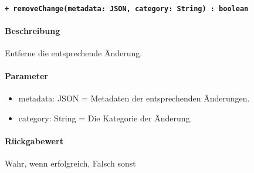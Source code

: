 \paragraph{\texttt{+ removeChange(metadata: JSON, category: String) : boolean}}%
\paragraph*{Beschreibung}
Entferne die entsprechende Änderung.
\paragraph*{Parameter}
\begin{itemize}
    \item metadata: JSON = Metadaten der entsprechenden Änderungen.
    \item category: String = Die Kategorie der Änderung.
\end{itemize}
\paragraph*{Rückgabewert}
Wahr, wenn erfolgreich, Falsch sonst
